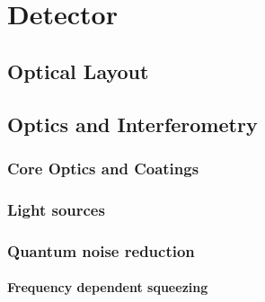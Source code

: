 \chapter{Detector}
\label{chap:Detector}

\section {Optical Layout}
\label{Sec:Layout}

\FloatBarrier
\section{Optics and Interferometry}
\label{Sec:Optics}

\subsection{Core Optics and Coatings}
\label{Sec:CoreOptics}


\subsection{Light sources}
\label{Sec:Lasers}



\label{Sec:Squeezers}

\subsection{Quantum noise reduction}


\label{Sec:QNR}

\subsubsection{Frequency dependent squeezing}

\label{Sec:FDS}




